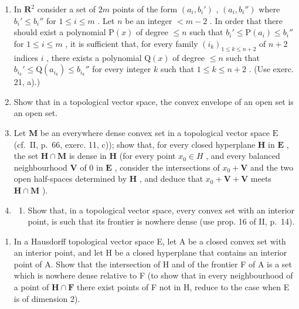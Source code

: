 \begin{enumerate}
\def\labelenumi{\arabic{enumi})}
\setcounter{enumi}{21}
\item
  In \(\mathbf{R}^2\) consider a set of \(2m\) points of the form \((a_i, b_i')\) , \((a_i, b_i'')\) where \(b_i' \leqslant b_i''\) for \(1 \leqslant i \leqslant m\) . Let \(n\) be an integer \(< m - 2\) . In order that there should exist a polynomial \(\mathrm{P}(x)\) of degree \(\leqslant n\) such that \(b_i' \leqslant \mathrm{P}(a_i) \leqslant b_i''\) for \(1 \leqslant i \leqslant m\) , it is sufficient that, for every family \((i_k)_{1 \leqslant k \leqslant n + 2}\) of \(n + 2\) indices \(i\) , there exists a polynomial \(\mathrm{Q}(x)\) of degree \(\leqslant n\) such that \(b_{i_k}' \leqslant \mathrm{Q}(a_{i_k}) \leqslant b_{i_k}''\) for every integer \(k\) such that \(1 \leqslant k \leqslant n + 2\) . (Use exerc. 21, a).)
\item
  Show that in a topological vector space, the convex envelope of an open set is an open set.
\item
  Let \(\mathbf{M}\) be an everywhere dense convex set in a topological vector space \(\mathrm{E}\) (cf.~II, p.~66, exerc. 11, c)); show that, for every closed hyperplane \(\mathbf{H}\) in \(\mathbf{E}\) , the set \(\mathbf{H} \cap \mathbf{M}\) is dense in \(\mathbf{H}\) (for every point \(x_0 \in H\) , and every balanced neighbourhood \(\mathbf{V}\) of 0 in \(\mathbf{E}\) , consider the intersections of \(x_0 + \mathbf{V}\) and the two open half-spaces determined by \(\mathbf{H}\) , and deduce that \(x_0 + \mathbf{V} + \mathbf{V}\) meets \(\mathbf{H} \cap \mathbf{M}\) ).
\item
  \begin{enumerate}
  \def\labelenumii{\alph{enumii})}
  \tightlist
  \item
    Show that, in a topological vector space, every convex set with an interior point, is such that its frontier is nowhere dense (use prop. 16 of II, p.~14).
  \end{enumerate}
\end{enumerate}

\begin{enumerate}
\def\labelenumi{\alph{enumi})}
\setcounter{enumi}{1}
\tightlist
\item
  In a Hausdorff topological vector space E, let A be a closed convex set with an interior point, and let H be a closed hyperplane that contains an interior point of A. Show that the intersection of H and of the frontier F of A is a set which is nowhere dense relative to F (to show that in every neighbourhood of a point of \(\mathbf{H} \cap \mathbf{F}\) there exist points of F not in H, reduce to the case when E is of dimension 2).
\end{enumerate}

